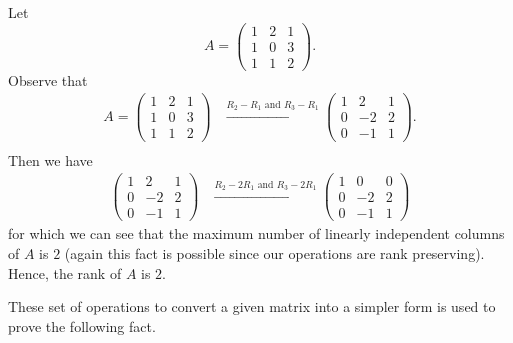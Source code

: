 \begin{eg}
    Let 
    \[  A = \begin{pmatrix} 
        1 & 2 & 1 \\
        1 & 0 & 3 \\
        1 & 1 & 2 
              \end{pmatrix}. \]
              Observe that
              \begin{align*}
                  A = \begin{pmatrix}
                      1 & 2 & 1 \\
                      1 & 0 & 3 \\
                      1 & 1 & 2 
                      \end{pmatrix} &\xrightarrow{{R}_{2} - R_{1} \text{ and } {R}_{3} - {R}_{1}  } \begin{pmatrix}
                  1 & 2 & 1 \\
                  0 & -2 & 2 \\
                  0 & -1 & 1 
                  \end{pmatrix}. \\
              \end{align*}
              Then we have
              \begin{align*}
                  \begin{pmatrix} 
                      1 & 2 & 1 \\
                      0 & -2 & 2 \\
                      0 & -1 & 1 
                  \end{pmatrix} &\xrightarrow{{R}_{2} - {2R}_{1} \text{ and } {R}_{3} - {2R}_{1}} \begin{pmatrix}
                  1 &  0 & 0  \\
                  0 & -2 & 2 \\
                  0 & -1 & 1 
                  \end{pmatrix}
              \end{align*}
              for which we can see that the maximum number of linearly independent columns of \( A  \) is \( 2  \) (again this fact is possible since our operations are rank preserving). Hence, the rank of \( A  \) is \( 2  \).
\end{eg}

These set of operations to convert a given matrix into a simpler form is used to prove the following fact.

